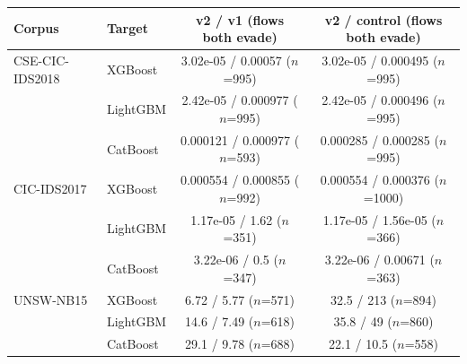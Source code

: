 \begin{tabular}{@{}llcc@{}}
\toprule
\textbf{Corpus} & \textbf{Target} & \textbf{v2 / v1 (flows both evade)} & \textbf{v2 / control (flows both evade)} \\
\midrule
CSE-CIC-IDS2018 & XGBoost & 3.02e-05 / 0.00057 ($n$=995) & 3.02e-05 / 0.000495 ($n$=995) \\
 & LightGBM & 2.42e-05 / 0.000977 ($n$=995) & 2.42e-05 / 0.000496 ($n$=995) \\
 & CatBoost & 0.000121 / 0.000977 ($n$=593) & 0.000285 / 0.000285 ($n$=995) \\
\midrule
CIC-IDS2017 & XGBoost & 0.000554 / 0.000855 ($n$=992) & 0.000554 / 0.000376 ($n$=1000) \\
 & LightGBM & 1.17e-05 / 1.62 ($n$=351) & 1.17e-05 / 1.56e-05 ($n$=366) \\
 & CatBoost & 3.22e-06 / 0.5 ($n$=347) & 3.22e-06 / 0.00671 ($n$=363) \\
\midrule
UNSW-NB15 & XGBoost & 6.72 / 5.77 ($n$=571) & 32.5 / 213 ($n$=894) \\
 & LightGBM & 14.6 / 7.49 ($n$=618) & 35.8 / 49 ($n$=860) \\
 & CatBoost & 29.1 / 9.78 ($n$=688) & 22.1 / 10.5 ($n$=558) \\
\bottomrule
\end{tabular}
